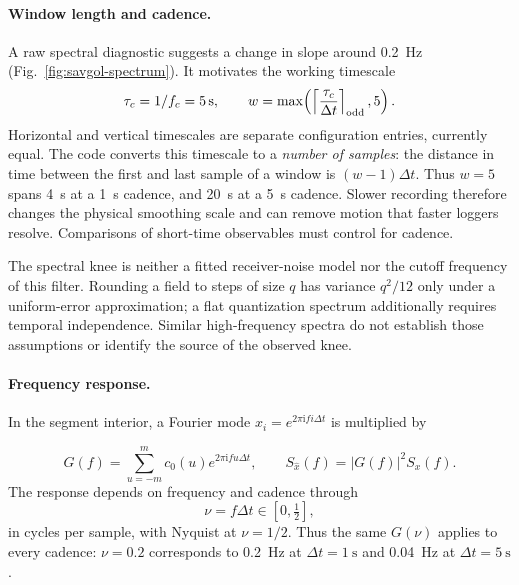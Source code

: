 \paragraph{Window length and cadence.}
A raw spectral diagnostic suggests a change in slope around \SI{0.2}{\hertz}
(Fig.~\ref{fig:savgol-spectrum}). It motivates the working timescale
\begin{equation}
 \tau_c=1/f_c=\SI{5}{\second},\qquad
 w=\max\!\left(\left\lceil\frac{\tau_c}{\Delta t}\right\rceil_{\mathrm{odd}},
               5\right).
 \label{eq:savgol-window}
\end{equation}
\label{eq:savgol-tauc}
Horizontal and vertical timescales are separate configuration entries, currently equal.
The code converts this timescale to a \emph{number of samples}: the distance in time
between the first and last sample of a window is $(w-1)\Delta t$. Thus $w=5$ spans
\SI{4}{\second} at a \SI{1}{\second} cadence, and \SI{20}{\second} at a
\SI{5}{\second} cadence. Slower recording therefore changes the physical smoothing
scale and can remove motion that faster loggers resolve. Comparisons of short-time
observables must control for cadence.

The spectral knee is neither a fitted receiver-noise model nor the cutoff frequency
of this filter. Rounding a field to
steps of size $q$ has variance $q^2/12$ only under a uniform-error approximation;
a flat quantization spectrum additionally requires temporal independence. Similar
high-frequency spectra do not establish those assumptions or identify the source of
the observed knee.

\paragraph{Frequency response.}
In the segment interior, a Fourier mode
$x_i=e^{2\pi\mathrm{i}fi\Delta t}$ is multiplied by

\begin{equation}
 G(f)=\sum_{u=-m}^{m}c_0(u)e^{2\pi\mathrm{i}fu\Delta t},\qquad
 S_{\widehat x}(f)=|G(f)|^2 S_x(f).
 \label{eq:savgol-response}
\end{equation}
The response depends on frequency and cadence through
\begin{equation}
 \nu=f\Delta t\in[0,\tfrac12],
 \label{eq:savgol-nu}
\end{equation}
in cycles per sample, with Nyquist at $\nu=1/2$. Thus the same $G(\nu)$ applies to
every cadence: $\nu=0.2$ corresponds to \SI{0.2}{\hertz} at
$\Delta t=\SI{1}{\second}$ and \SI{0.04}{\hertz} at
$\Delta t=\SI{5}{\second}$.

